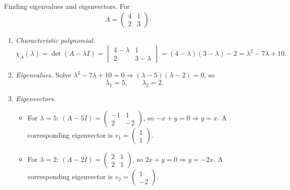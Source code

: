 \documentclass[11pt]{article}
\def\textbf#1{#1}%
\def\mathbf#1{#1}%
\begin{document}

\begin{solution}
\textbf{Finding eigenvalues and eigenvectors.} For
\[
A=\begin{pmatrix}4&1\\[2pt]2&3\end{pmatrix}:
\]
\begin{enumerate}
\item \emph{Characteristic polynomial.}
\[
\chi_A(\lambda)=\det(A-\lambda I)=
\begin{vmatrix}4-\lambda&1\\[2pt]2&3-\lambda\end{vmatrix}
=(4-\lambda)(3-\lambda)-2
=\lambda^2-7\lambda+10.
\]

\item \emph{Eigenvalues.} Solve $\lambda^2-7\lambda+10=0\Rightarrow(\lambda-5)(\lambda-2)=0$, so
\[
\lambda_1=5,\qquad \lambda_2=2.
\]

\item \emph{Eigenvectors.}
\begin{itemize}
\item For $\lambda=5$: $(A-5I)=\begin{pmatrix}-1&1\\[2pt]2&-2\end{pmatrix}$, so $-x+y=0\Rightarrow y=x$.
A corresponding eigenvector is $\mathbf{v}_1=\begin{pmatrix}1\\[2pt]1\end{pmatrix}$.

\item For $\lambda=2$: $(A-2I)=\begin{pmatrix}2&1\\[2pt]2&1\end{pmatrix}$, so $2x+y=0\Rightarrow y=-2x$.
A corresponding eigenvector is $\mathbf{v}_2=\begin{pmatrix}1\\[2pt]-2\end{pmatrix}$.
\end{itemize}
\end{enumerate}
\end{solution}

\end{document}
